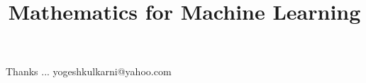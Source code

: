 \documentclass[xcolor=dvipsnames,compress,t,pdf,9pt]{beamer}
\title[\insertframenumber /\inserttotalframenumber]{Mathematics for Machine Learning}
\begin{document}
	\begin{frame}
	\titlepage
	\end{frame}
	
	

	\begin{frame}[c]{}
	Thanks ...
	\vspace{5mm}
	yogeshkulkarni@yahoo.com
	\end{frame}
\end{document}
